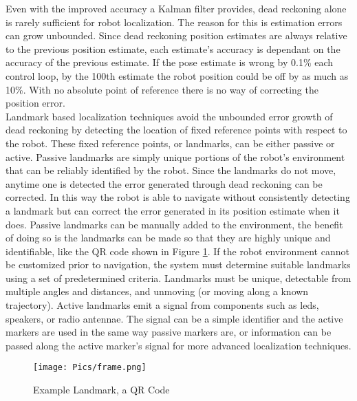 Even with the improved accuracy a Kalman filter provides, dead reckoning alone is rarely sufficient for robot localization. The reason for this is estimation errors can grow unbounded. Since dead reckoning position estimates are always relative to the previous position estimate, each estimate's accuracy is dependant on the accuracy of the previous estimate. If the pose estimate is wrong by 0.1\% each control loop, by the 100th estimate the robot position could be off by as much as 10\%. With no absolute point of reference there is no way of correcting the position error.\\

Landmark based localization techniques avoid the unbounded error growth of dead reckoning by detecting the location of fixed reference points with respect to the robot. These fixed reference points, or landmarks, can be either passive or active. Passive landmarks are simply unique portions of the robot's environment that can be reliably identified by the robot. Since the landmarks do not move, anytime one is detected the error generated through dead reckoning can be corrected. In this way the robot is able to navigate without consistently detecting a landmark but can correct the error generated in its position estimate when it does. Passive landmarks can be manually added to the environment, the benefit of doing so is the landmarks can be made so that they are highly unique and identifiable, like the QR code shown in Figure \ref{fig:qr}. If the robot environment cannot be customized prior to navigation, the system must determine suitable landmarks using a set of predetermined criteria. Landmarks must be unique, detectable from multiple angles and distances, and unmoving (or moving along a known trajectory). Active landmarks emit a signal from components such as \acrshort{led}s, speakers, or radio antennae. The signal can be a simple identifier and the active markers are used in the same way passive markers are, or information can be passed along the active marker's signal for more advanced localization techniques.\\

\begin{figure}
    \centering
    \texttt{[image: Pics/frame.png]}
    \caption{Example Landmark, a QR Code}
    \label{fig:qr}
\end{figure}

